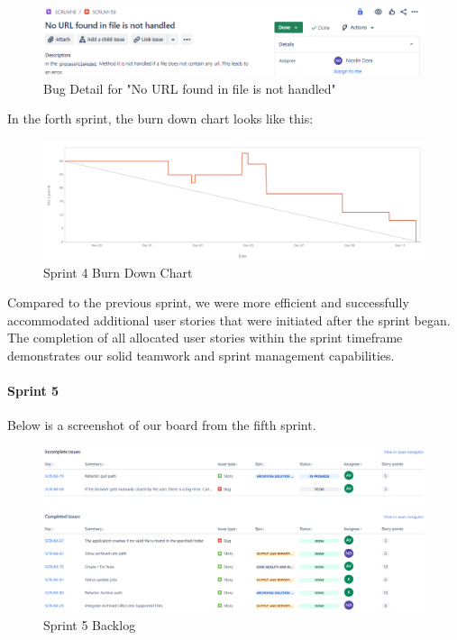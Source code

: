 \begin{figure}[h!]
    \centering
    \includegraphics[width=1\textwidth]{pictures/Scrum/Sprint 4/Bug_1}
    \caption{Bug Detail for "No URL found in file is not handled"}
    \label{fig:sprint_4_bug_1}
\end{figure}


In the forth sprint, the burn down chart looks like this:
\begin{figure}[h!]
    \centering
    \includegraphics[width=1\textwidth]{pictures/Scrum/Sprint 4/Sprint4_Burndownchart}
    \caption{Sprint 4 Burn Down Chart}
    \label{fig:sprint_4_bunrdown_chart}
\end{figure}

Compared to the previous sprint, we were more efficient and successfully accommodated additional user stories that were initiated after the sprint began.
The completion of all allocated user stories within the sprint timeframe demonstrates our solid teamwork and sprint management capabilities.
\clearpage


\paragraph{Sprint 5}
Below is a screenshot of our board from the fifth sprint.
\begin{figure}[h!]
    \centering
    \includegraphics[width=1\textwidth]{pictures/Scrum/Sprint 5/Sprint5_Backlog}
    \caption{Sprint 5 Backlog}
    \label{fig:sprint_5_backlog}
\end{figure}

